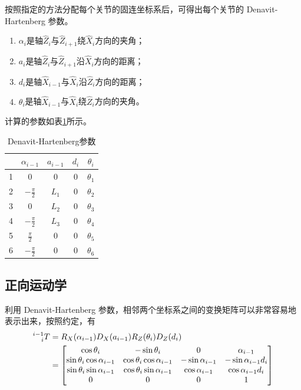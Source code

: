 \documentclass{ctexart}
\begin{document}


按照指定的方法分配每个关节的固连坐标系后，可得出每个关节的 Denavit-Hartenberg 参数。
\begin{enumerate}
    \item $\alpha_i$是轴$\hat Z_i$与$\hat Z_{i+1}$绕$\hat X_i$方向的夹角；
    \item $a_i$是轴$\hat Z_i$与$\hat Z_{i+1}$沿$\hat X_i$方向的距离；
    \item $d_i$是轴$\hat X_{i-1}$与$\hat X_i$沿$\hat Z_i$方向的距离；
    \item $\theta_i$是轴$\hat X_{i-1}$与$\hat X_i$绕$\hat Z_i$方向的夹角。
\end{enumerate}
计算的参数如表\ref{tab:DH-params}所示。

\begin{table}[ht]
    \caption{Denavit-Hartenberg参数}
    \label{tab:DH-params}
    \centering
    \begin{tabular}{c|cccc}
        \hline
        & $\alpha_{i-1}$ & $a_{i-1}$ & $d_i$ & $\theta_i$ \\
        \hline
        1 & $0$ & $0$ & $0$ & $\theta_1$ \\
        2 & $-\frac{\pi}{2}$ & $L_1$ & $0$ & $\theta_2$ \\
        3 & $0$ & $L_2$ & $0$ & $\theta_3$ \\
        4 & $-\frac{\pi}{2}$ & $L_3$ & $0$ & $\theta_4$\\
        5 & $\frac{\pi}{2}$ & $0$ & $0$ & $\theta_5$\\
        6 & $-\frac{\pi}{2}$ & $0$ & $0$ & $\theta_6$\\ \hline
    \end{tabular}
\end{table}

\subsection{正向运动学}

利用 Denavit-Hartenberg 参数，相邻两个坐标系之间的变换矩阵可以非常容易地表示出来，按照约定，有
\[ 
    \begin{aligned}
        \prescript{i-1}{i}{T} 
        &= R_X (\alpha_{i-1}) D_X (a_{i-1}) R_Z (\theta_i) D_Z (d_i) \\
        &= \begin{bmatrix}
            \cos \theta_i & - \sin \theta_i & 0 & \alpha_{i-1} \\
            \sin \theta_i \cos \alpha_{i-1} & \cos \theta_i \cos \alpha_{i-1} & - \sin \alpha_{i-1} & - \sin \alpha_{i-1} d_i \\
            \sin \theta_i \sin \alpha_{i-1} & \cos \theta_i \sin \alpha_{i-1} & \cos \alpha_{i-1} & \cos \alpha_{i-1} d_i \\
            0 & 0 & 0 & 1
        \end{bmatrix}
    \end{aligned}
\]
\end{document}
